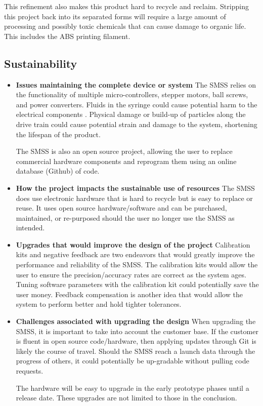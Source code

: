 \documentclass[journal]{IEEEtran}
\begin{document}
        This refinement also makes this product hard to recycle and reclaim. Stripping this project back into its separated forms will require a large amount of processing and possibly toxic chemicals that can cause damage to organic life. This includes the ABS printing filament.
    
    \subsection{Sustainability}
        \begin{itemize}
            \item {\bfseries Issues maintaining the complete device or system}
                The SMSS relies on the functionality of multiple micro-controllers, stepper motors, ball screws, and power converters. Fluids in the syringe could cause potential harm to the electrical components . Physical damage or build-up of particles along the drive train could cause potential strain and damage to the system, shortening the lifespan of the product.
                
                The SMSS is also an open source project, allowing the user to replace commercial hardware components and reprogram them using an online database (Github) of code.
                
            \item {\bfseries How the project impacts the sustainable use of resources}
                The SMSS does use electronic hardware that is hard to recycle but is easy to replace or reuse. It uses open source hardware/software and can be purchased, maintained, or re-purposed should the user no longer use the SMSS as intended.
            \item {\bfseries Upgrades that would improve the design of the project}
                Calibration kits and negative feedback are two endeavors that would greatly improve the performance and reliability of the SMSS. The calibration kits would allow the user to ensure the precision/accuracy rates are correct as the system ages. Tuning software parameters with the calibration kit could potentially save the user money. Feedback compensation is another idea that would allow the system to perform better and hold tighter tolerances.
            \item {\bfseries Challenges associated with upgrading the design}
                When upgrading the SMSS, it is important to take into account the customer base. If the customer is fluent in open source code/hardware, then applying updates through Git is likely the course of travel. Should the SMSS reach a launch data through the progress of others, it could potentially be up-gradable without pulling code requests. 
            
                The hardware will be easy to upgrade in the early prototype phases until a release date. These upgrades are not limited to those in the conclusion. 
        \end{itemize}
    
\end{document}
